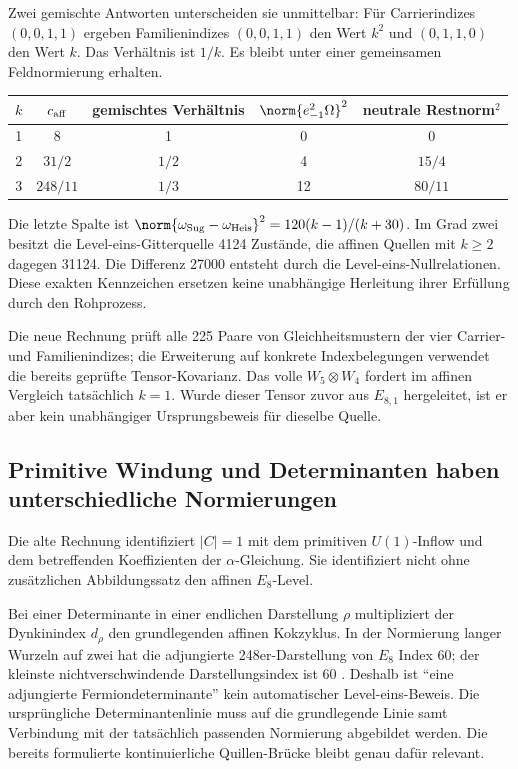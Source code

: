 Zwei gemischte Antworten unterscheiden sie unmittelbar: Für Carrierindizes $(0,0,1,1)$ ergeben Familienindizes $(0,0,1,1)$ den Wert $k^2$ und $(0,1,1,0)$ den Wert $k$. Das Verhältnis ist $1/k$. Es bleibt unter einer gemeinsamen Feldnormierung erhalten.

\begin{center}
\begin{tabular}{ccccc}
\toprule
$k$ & $c_{\rm aff}$ & gemischtes Verhältnis & $\norm{e_{-1}^2\Omega}^2$ & neutrale Restnorm$^2$\\\midrule
1 & 8 & 1 & 0 & 0\\
2 & $31/2$ & $1/2$ & 4 & $15/4$\\
3 & $248/11$ & $1/3$ & 12 & $80/11$\\\bottomrule
\end{tabular}
\end{center}
Die letzte Spalte ist $\norm{\omega_{\rm Sug}-\omega_{\rm Heis}}^2=120(k-1)/(k+30)$. Im Grad zwei besitzt die Level-eins-Gitterquelle 4124 Zustände, die affinen Quellen mit $k\ge2$ dagegen 31124. Die Differenz 27000 entsteht durch die Level-eins-Nullrelationen. Diese exakten Kennzeichen ersetzen keine unabhängige Herleitung ihrer Erfüllung durch den Rohprozess.

Die neue Rechnung prüft alle 225 Paare von Gleichheitsmustern der vier Carrier- und Familienindizes; die Erweiterung auf konkrete Indexbelegungen verwendet die bereits geprüfte Tensor-Kovarianz. Das volle $W_5\otimes W_4$ fordert im affinen Vergleich tatsächlich $k=1$. Wurde dieser Tensor zuvor aus $E_{8,1}$ hergeleitet, ist er aber kein unabhängiger Ursprungsbeweis für dieselbe Quelle.

\subsection{Primitive Windung und Determinanten haben unterschiedliche Normierungen}
Die alte Rechnung  identifiziert $|C|=1$ mit dem primitiven $U(1)$-Inflow und dem betreffenden Koeffizienten der $\alpha$-Gleichung. Sie identifiziert nicht ohne zusätzlichen Abbildungssatz den affinen $E_8$-Level.

Bei einer Determinante in einer endlichen Darstellung $\rho$ multipliziert der Dynkinindex $d_\rho$ den grundlegenden affinen Kokzyklus. In der Normierung langer Wurzeln auf zwei hat die adjungierte 248er-Darstellung von $E_8$ Index 60; der kleinste nichtverschwindende Darstellungsindex ist 60 \cite{laszlosorger}. Deshalb ist ``eine adjungierte Fermiondeterminante'' kein automatischer Level-eins-Beweis. Die ursprüngliche Determinantenlinie muss auf die grundlegende Linie samt Verbindung mit der tatsächlich passenden Normierung abgebildet werden. Die bereits formulierte kontinuierliche Quillen-Brücke bleibt genau dafür relevant.

